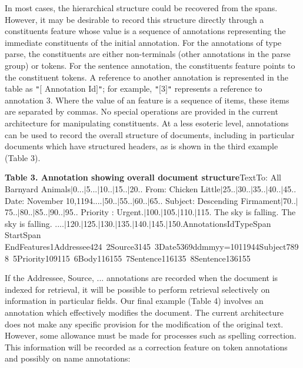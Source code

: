 In most cases, the hierarchical structure could be recovered from the
      spans. However, it may be desirable to record this structure directly through a
      constituents feature whose value is a sequence of annotations representing
      the immediate constituents of the initial annotation. For the annotations of
      type parse, the constituents are either non-terminals (other annotations in the
      parse group) or tokens. For the sentence annotation, the constituents feature
      points to the constituent tokens. A reference to another annotation is
      represented in the table as {\tt{}"{}}\mbox{$[$} Annotation Id\mbox{$]$}{\tt{}"{}}; for example, {\tt{}"{}}\mbox{$[$}3\mbox{$]$}{\tt{}"{}} represents a
      reference to annotation 3. Where the value of an feature is a sequence of
      items, these items are separated by commas. No special operations are provided
      in the current architecture for manipulating constituents. At a less esoteric
      level, annotations can be used to record the overall structure of documents,
      including in particular documents which have structured headers, as is shown in
      the third example (Table 3).

{\bf Table 3. Annotation showing overall document structure}TextTo: All Barnyard Animals\mbox{$|$}0...\mbox{$|$}5...\mbox{$|$}10..\mbox{$|$}15..\mbox{$|$}20.. From: Chicken
            Little\mbox{$|$}25..\mbox{$|$}30..\mbox{$|$}35..\mbox{$|$}40..\mbox{$|$}45..  Date: November 10,1194....\mbox{$|$}50..\mbox{$|$}55..\mbox{$|$}60..\mbox{$|$}65.. Subject: Descending
            Firmament\mbox{$|$}70..\mbox{$|$}75..\mbox{$|$}80..\mbox{$|$}85..\mbox{$|$}90..\mbox{$|$}95.. Priority :
            Urgent.\mbox{$|$}100.\mbox{$|$}105.\mbox{$|$}110.\mbox{$|$}115. The sky is falling. The sky is
            falling.
            ....\mbox{$|$}120.\mbox{$|$}125.\mbox{$|$}130.\mbox{$|$}135.\mbox{$|$}140.\mbox{$|$}145.\mbox{$|$}150.AnnotationsIdTypeSpan
            StartSpan
            EndFeatures1Addressee424~2Source3145~3Date5369ddmmyy=1011944Subject7898~5Priority109115~6Body116155~7Sentence116135~8Sentence136155~

 If the Addressee, Source, ... annotations are recorded when the
      document is indexed for retrieval, it will be possible to perform retrieval
      selectively on information in particular fields. Our final example (Table 4)
      involves an annotation which effectively modifies the document. The current
      architecture does not make any specific provision for the modification of the
      original text. However, some allowance must be made for processes such as
      spelling correction. This information will be recorded as a correction
      feature on token annotations and possibly on name
      annotations:

